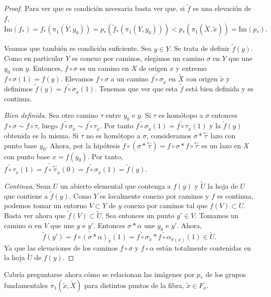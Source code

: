 \documentclass[12pt,a4paper]{book}
\theoremstyle{definition} \newtheorem{defn}[thm]{Definición}
\theoremstyle{definition} \newtheorem{ejemplo}[thm]{Ejemplo}
\theoremstyle{definition} \newtheorem{ejercicio}[thm]{Ejercicio}
\theoremstyle{remark} \newtheorem*{obs}{Observación}
\def\gf{\pi_1}
\def\XX{\tilde{X}}
\def\xx{\tilde{x}}
\def\im{\mathrm{Im}}
\newcommand\cev[1]{\overset{\leftarrow}{#1}}
\begin{document}
\begin{proof}
  Para ver que es condición necesaria basta ver que, si $\tilde{f}$ es una elevación de $f$,
  \begin{equation*}
    \im(f_*)=f_*(\gf(Y,y_0))=p_*(\tilde{f}_*(\gf(Y,y_0)))<p_*(\gf(\XX,\xx))=\im(p_*).
  \end{equation*}

  Veamos que también es condición suficiente. Sea $y\in Y$. Se trata de definir $\tilde{f}(y)$. Como en particular $Y$ es conexo por caminos, elegimos un camino $\sigma$ en $Y$ que une $y_0$ con $y$. Entonces, $f\circ \sigma$ es un camino en $X$ de origen $x$ y extremo $f\circ \sigma (1)=f(y)$. Elevamos $f\circ \sigma$ a un camino $\widetilde{f\circ\sigma}_{\xx}$ en $\XX$ con origen $\xx$ y definimos $\tilde{f}(y)=\widetilde{f\circ\sigma}_{\xx}(1)$. Tenemos que ver que esta $\tilde{f}$ está bien definida y es continua.

  \textit{Bien definida}. Sea otro camino $\tau$ entre $y_0$ e $y$. Si $\tau$ es homótopo a $\sigma$ entonces $f\circ \sigma\sim f\circ \tau$, luego $\widetilde{f\circ\sigma}_{\xx}\sim\widetilde{f\circ\tau}_{\xx}$. Por tanto $\widetilde{f\circ\sigma}_{\xx}(1)=\widetilde{f\circ\tau}_{\xx}(1)$ y la $\tilde{f}(y)$ obtenida es la misma. Si $\tau$ no es homótopo a $\sigma$, consideramos $\sigma*\cev{\tau}$ lazo con punto base $y_0$. Ahora, por la hipótesis $f\circ(\sigma*\cev{\tau})=f\circ\sigma * f\circ \cev{\tau}$ es un lazo en $X$ con punto base $x=f(y_0)$. Por tanto, $\widetilde{f\circ\tau}_{\xx}(1)=\widetilde{f\circ\cev{\tau}}_{\xx}(0)=\widetilde{f\circ\sigma}_{\xx}(1)=\tilde{f}(y)$.

  \textit{Continua}. Sean $U$ un abierto elemental que contenga a $f(y)$ y $\tilde{U}$ la hoja de $U$ que contiene a $\tilde{f}(y)$. Como $Y$ es localmente conexo por caminos y $f$ es continua, podemos tomar un entorno $V\subset Y$ de $y$ conexo por caminos tal que $f(V)\subset U$. Basta ver ahora que $\tilde{f}(V)\subset \tilde{U}$. Sea entonces un punto $y'\in V$. Tomamos un camino $\alpha$ en $V$ que une $y$ e $y'$. Entonces $\sigma * \alpha$ une $y_0$ e $y'$. Ahora, $$\tilde{f}(y')=\widetilde{f\circ(\sigma*\alpha)}_{\xx}(1)=\widetilde{f\circ\sigma}_{\xx}*\widetilde{f\circ\alpha}_{\tilde{\sigma}(x)}(1)\in \tilde{U}.$$ Ya que las elevaciones de los caminos $f\circ \sigma$ y $f\circ \alpha$ están totalmente contenidas en la hoja $\tilde{U}$ de $f(y)$.
\end{proof}

Cabría preguntarse ahora cómo se relacionan las imágenes por $p_*$ de los grupos fundamentales $\gf(\xx,\XX)$ para distintos puntos de la fibra, $\xx\in F_x$.
\end{document}
